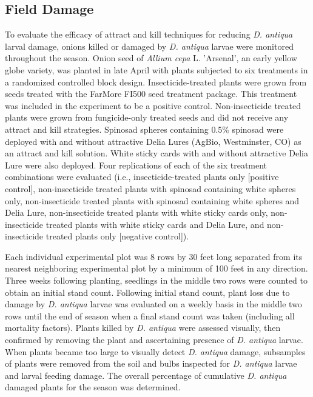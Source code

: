 \documentclass[alpha-refs]{wiley-article}
\begin{document}
\subsection{Field Damage}

To evaluate the efficacy of attract and kill techniques for reducing \textit{D. antiqua} larval damage, onions killed or damaged by \textit{D. antiqua} larvae were monitored throughout the season. Onion seed of \textit{Allium cepa} L. ’Arsenal’, an early yellow globe variety, was planted in late April with plants subjected to six treatments in a randomized controlled block design. Insecticide-treated plants were grown from seeds treated with the FarMore FI500 seed treatment package. This treatment was included in the experiment to be a positive control. Non-insecticide treated plants were grown from fungicide-only treated seeds and did not receive any attract and kill strategies. Spinosad spheres containing 0.5\% spinosad were deployed with and without attractive Delia Lures (AgBio, Westminster, CO) as an attract and kill solution. White sticky cards with and without attractive Delia Lure were also deployed. Four replications of each of the six treatment combinations were evaluated (i.e., insecticide-treated plants only [positive control], non-insecticide treated plants with spinosad containing white spheres only, non-insecticide treated plants with spinosad containing white spheres and Delia Lure, non-insecticide treated plants with white sticky cards only, non-insecticide treated plants with white sticky cards and Delia Lure, and non-insecticide treated plants only [negative control]).

Each individual experimental plot was 8 rows by 30 feet long separated from its nearest neighboring experimental plot by a minimum of 100 feet in any direction. Three weeks following planting, seedlings in the middle two rows were counted to obtain an initial stand count. Following initial stand count, plant loss due to damage by \textit{D. antiqua} larvae was evaluated on a weekly basis in the middle two rows until the end of season when a final stand count was taken (including all mortality factors). Plants killed by \textit{D. antiqua} were assessed visually, then confirmed by removing the plant and ascertaining presence of \textit{D. antiqua} larvae. When plants became too large to visually detect \textit{D. antiqua} damage, subsamples of plants were removed from the soil and bulbs inspected for \textit{D. antiqua} larvae and larval feeding damage. The overall percentage of cumulative \textit{D. antiqua} damaged plants for the season was determined. 
\end{document}
